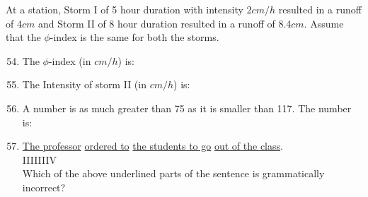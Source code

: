 \documentclass[journal,12pt,onecolumn]{IEEEtran}
\theoremstyle{remark}
\begin{document}
At a station, Storm I of 5 hour duration with intensity 2$cm/h$ resulted in a runoff of 4$cm$ and Storm II of 8 hour duration resulted in a runoff of 8.4$cm$. Assume that the $\phi$-index is the same for both the storms.
\begin{enumerate}
\setcounter{enumi}{53}
\item The $\phi$-index (in $cm/h$) is:
\begin{enumerate}
\end{enumerate}
\item  The Intensity of storm II (in $cm/h$) is:
\begin{enumerate}
\end{enumerate}
\item A number is as much greater than 75 as it is smaller than 117. The number is:
\begin{enumerate}
\end{enumerate}
\item \underline{The professor} \underline{ordered to} \underline{the students to go} \underline{out of the class}.\\
\hspace{3cm}I\hspace{3cm}II\hspace{2cm}III\hspace{3cm}IV\\
Which of the above underlined parts of the sentence is grammatically incorrect?
\begin{enumerate}
\end{enumerate}
\end{enumerate}
\end{document}
